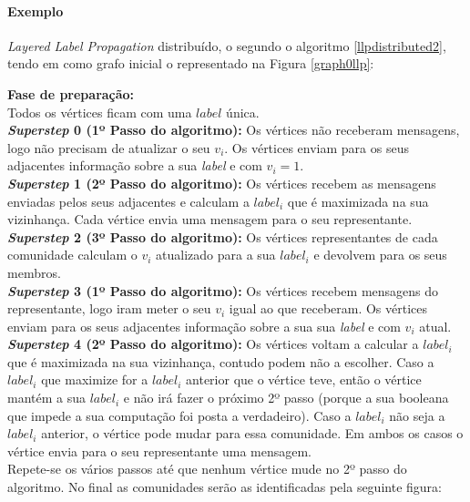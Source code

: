 \clearpage

 \paragraph{Exemplo} \textit{Layered Label Propagation} distribuído, o  segundo 
o algoritmo \ref{llpdistributed2}, tendo em como grafo inicial o representado 
na 
Figura \ref{graph0llp}:

{\bf Fase de preparação:}\\
Todos os vértices ficam com uma $label$ única. 
\\[0.25cm]
{\bf \textit{Superstep} 0  (1º Passo do algoritmo):}
Os vértices não receberam mensagens, logo não precisam de atualizar o seu $v_i$.
Os vértices enviam para os seus adjacentes informação sobre a sua 
\textit{label} e com $v_i=1$.
\\[0.25cm]
{\bf \textit{Superstep} 1 (2º Passo do algoritmo):}
Os vértices recebem as mensagens enviadas pelos seus adjacentes e calculam a 
$label_i$ que é maximizada na sua vizinhança. Cada vértice envia uma mensagem 
para o seu representante.
\\[0.25cm]
{\bf \textit{Superstep} 2 (3º Passo do algoritmo):} Os vértices representantes 
de cada comunidade calculam o $v_i$ atualizado para a sua $label_i$ e devolvem 
para os seus membros.
\\[0.25cm]
{\bf \textit{Superstep} 3 (1º Passo do algoritmo):}
Os vértices recebem mensagens do representante, logo iram meter o seu $v_i$ 
igual ao que receberam.
Os vértices enviam para os seus adjacentes informação sobre a sua sua 
\textit{label} e com $v_i$ atual.
\\[0.25cm]
{\bf \textit{Superstep} 4 (2º Passo do algoritmo):}
Os vértices voltam a calcular a $label_i$ que é maximizada na sua vizinhança, 
contudo podem não a escolher. Caso a $label_i$ que maximize for a $label_i$ 
anterior que o vértice teve, então o vértice mantém a sua $label_i$ e não irá 
fazer o próximo 2º passo (porque a sua booleana que impede a sua computação foi 
posta a verdadeiro). Caso a $label_i$ não seja a $label_i$ anterior, o vértice 
pode mudar para essa comunidade. Em ambos os casos o vértice envia para o seu 
representante uma mensagem.
\\[0.25cm]
Repete-se os vários passos até que nenhum vértice mude no 2º passo do 
algoritmo. No final as comunidades serão as identificadas pela seguinte figura:


